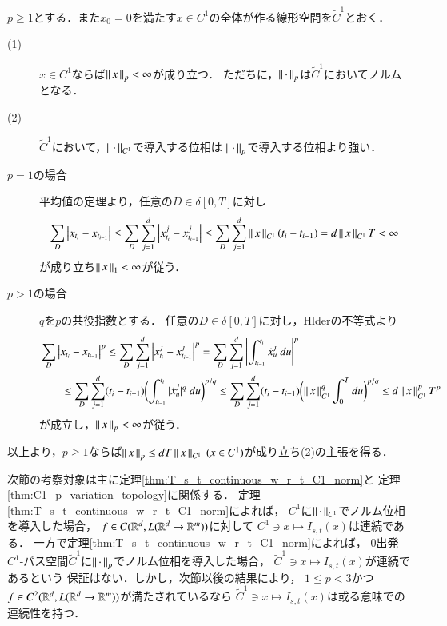 \begin{screen}
	\begin{thm}\label{thm:C1_p_variation_topology}
		$p \geq 1$とする．また$x_0 = 0$を満たす$x \in C^1$の全体が作る線形空間を$\tilde{C}^1$とおく．
		\begin{description}
			\item[(1)] $x \in C^1$ならば$\left\|\, x\, \right\|_{p} < \infty$が成り立つ．
				ただちに，$\left\|\, \cdot\, \right\|_{p}$は$\tilde{C}^1$においてノルムとなる．
			\item[(2)] $\tilde{C}^1$において，$\left\|\, \cdot\, \right\|_{C^1}$で導入する位相は
				$\left\|\, \cdot\, \right\|_{p}$で導入する位相より強い．
		\end{description}
	\end{thm}
\end{screen}

\begin{prf}\mbox{}
	\begin{description}
		\item[$p = 1$の場合]
			平均値の定理より，任意の$D \in \delta[0,T]$に対し
			\begin{align}
				\sum_D \left| x_{t_i} - x_{t_{i-1}} \right|
				\leq \sum_D \sum_{j=1}^d \left| x^j_{t_i} - x^j_{t_{i-1}} \right|
				\leq \sum_D \sum_{j=1}^d \left\|\, x\, \right\|_{C^1}(t_i - t_{i-1})
				= d\left\|\, x\, \right\|_{C^1}T < \infty
			\end{align}
			が成り立ち$\left\|\, x\, \right\|_{1} < \infty$が従う．
		
		\item[$p > 1$の場合] $q$を$p$の共役指数とする．
			任意の$D \in \delta[0,T]$に対し，Hlderの不等式より
			\begin{align}
				&\sum_D \left| x_{t_i} - x_{t_{i-1}} \right|^p
				\leq \sum_D \sum_{j=1}^d \left| x^j_{t_i} - x^j_{t_{i-1}} \right|^p
				= \sum_D \sum_{j=1}^d \left| \int_{t_{i-1}}^{t_i} \dot{x}^j_{u}\ du \right|^p \\
				&\qquad \leq \sum_D \sum_{j=1}^d (t_i - t_{i-1})
					\biggl( \int_{t_{i-1}}^{t_i} | \dot{x}^j_{u} |^q\ du \biggr)^{p/q}
				\leq \sum_D \sum_{j=1}^d (t_i - t_{i-1})
					\biggl( \left\|\, x\, \right\|_{C^1}^q \int_{0}^{T} du \biggr)^{p/q}
				\leq d\left\|\, x\, \right\|_{C^1}^p T^p
			\end{align}
			が成立し，$\left\|\, x\, \right\|_{p} < \infty$が従う．
	\end{description}
	以上より，$p \geq 1$ならば$\left\|\, x\, \right\|_{p} \leq dT\left\|\, x\, \right\|_{C^1}\ (x \in C^1)$が成り立ち(2)の主張を得る．
	\QED
\end{prf}

	次節の考察対象は主に定理\ref{thm:T_s_t_continuous_w_r_t_C1_norm}と
	定理\ref{thm:C1_p_variation_topology}に関係する．
	定理\ref{thm:T_s_t_continuous_w_r_t_C1_norm}によれば，
	$C^1$に$\left\|\, \cdot\, \right\|_{C^1}$でノルム位相を導入した場合，
	$f \in C(\mathbb{R}^d,L(\mathbb{R}^d \rightarrow \mathbb{R}^m))$に対して
	$C^1 \ni x \longmapsto I_{s,t}(x)$は連続である．
	一方で定理\ref{thm:T_s_t_continuous_w_r_t_C1_norm}によれば，
	0出発$C^1$-パス空間$\tilde{C}^1$に$\left\|\, \cdot\, \right\|_{p}$でノルム位相を導入した場合，
	$\tilde{C}^1 \ni x \longmapsto I_{s,t}(x)$が連続であるという
	保証はない．しかし，次節以後の結果により，
	$1 \leq p < 3$かつ$f \in C^2(\mathbb{R}^d,L(\mathbb{R}^d \rightarrow \mathbb{R}^m))$が満たされているなら
	$\tilde{C}^1 \ni x \longmapsto I_{s,t}(x)$は或る意味での連続性を持つ．

